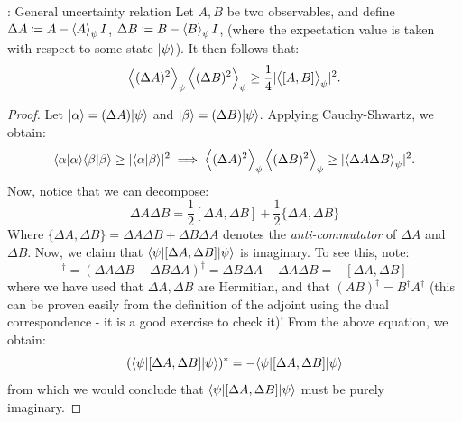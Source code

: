 \begin{thmbox}{: General uncertainty relation}
    Let $A, B$ be two observables, and define $\Delta A \coloneqq A - \left< A \right>_\psi I$, $\Delta B \coloneqq B - \left< B \right>_\psi I$, (where the expectation value is taken with respect to some state $\lvert \psi \rangle$). It then follows that:
    \begin{equation}
        \left< (\Delta A)^2 \right>_\psi\left< (\Delta B)^2 \right>_\psi \geq \frac{1}{4}\lvert \left< [A, B] \right>_\psi \rvert^2.
    \end{equation}
\end{thmbox}
\begin{proof}
    Let $\lvert \alpha \rangle = (\Delta A)\lvert \psi \rangle$ and $\lvert \beta \rangle = (\Delta B)\lvert \psi \rangle$. Applying Cauchy-Shwartz, we obtain:
    \begin{equation}\label{eq-CSapplied}
        \langle \alpha \lvert \alpha \rangle\langle \beta \lvert \beta \rangle \geq \lvert \langle \alpha \lvert \beta \rangle \rvert^2 \implies \left< (\Delta A)^2 \right>_\psi\left< (\Delta B)^2 \right>_\psi \geq \lvert \left< \Delta A\Delta B \right>_\psi \rvert^2.
    \end{equation}
    Now, notice that we can decompose:
    \begin{equation}
        \Delta A \Delta B = \frac{1}{2}[\Delta A, \Delta B] + \frac{1}{2}\{\Delta A, \Delta B \}
    \end{equation}
    Where $\{\Delta A, \Delta B\} = \Delta A\Delta B + \Delta B\Delta A$ denotes the \emph{anti-commutator} of $\Delta A$ and $\Delta B$. Now, we claim that $\langle \psi \rvert[\Delta A, \Delta B]\lvert \psi \rangle$ is imaginary. To see this, note:
    \begin{equation}
        [\Delta A, \Delta B]^\dag = (\Delta A \Delta B - \Delta B \Delta A)^\dag = \Delta B \Delta A - \Delta A \Delta B = -[\Delta A, \Delta B]
    \end{equation}
    where we have used that $\Delta A, \Delta B$ are Hermitian, and that $(AB)^\dag = B^\dag A^\dag$ (this can be proven easily from the definition of the adjoint using the dual correspondence - it is a good exercise to check it)! From the above equation, we obtain:
    \begin{equation}
        (\langle \psi \rvert[\Delta A, \Delta B]\lvert \psi \rangle)^* = -\langle \psi \rvert[\Delta A, \Delta B]\lvert \psi \rangle
    \end{equation}
    from which we would conclude that $\langle \psi \rvert[\Delta A, \Delta B]\lvert \psi \rangle$ must be purely imaginary. 


\end{proof}
